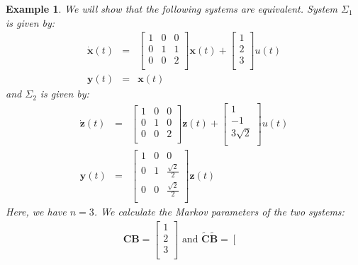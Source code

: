 \documentclass[a4paper,10pt,oneside]{book}
\newtheorem{example}{Example}
\begin{document}
\begin{example}\label{example:diagonalization}
 We will show that the following systems are equivalent. System $\Sigma_1$ is given by:
\begin{eqnarray}
\dot{\mathbf{x}}(t)&=&\left[ {\begin{array}{ccc}
 1 & 0 & 0  \\
 0 & 1 & 1  \\
 0 & 0 & 2 \\
 \end{array} } \right]
\mathbf{x}(t)+ 
\left[ {\begin{array}{c}
 1 \\ 2 \\ 3 \\
 \end{array} } \right]
u(t)\\
\mathbf{y}(t)&=&\mathbf{x}(t)
\end{eqnarray} 
and $\Sigma_2$ is given by:
\begin{eqnarray}
\dot{\mathbf{z}}(t)&=&\left[ {\begin{array}{ccc}
 1 & 0 & 0  \\
 0 & 1 & 0  \\
 0 & 0 & 2 \\
 \end{array} } \right]
\mathbf{z}(t)+ 
\left[ {\begin{array}{c}
 1 \\ -1 \\ 3\sqrt{2} \\
 \end{array} } \right]
u(t)\\
\mathbf{y}(t)&=&\left[ {\begin{array}{ccc}
 1 & 0 & 0  \\
 0 & 1 & \frac{\sqrt{2}}{2}  \\
 0 & 0 & \frac{\sqrt{2}}{2} \\
 \end{array} } \right]\mathbf{z}(t)
\end{eqnarray} 
Here, we have $n=3$. We calculate the Markov parameters of the two systems:
\begin{eqnarray}
 \mathbf{CB}=\left[ {\begin{array}{c}
 1 \\ 2 \\ 3 \\
 \end{array} } \right] \text{ and }
 \tilde{\mathbf{C}}\tilde{\mathbf{B}}=\left[ {\begin{array}{ccc}

\end{array}}
\end{eqnarray}
\end{example}
\end{document}
